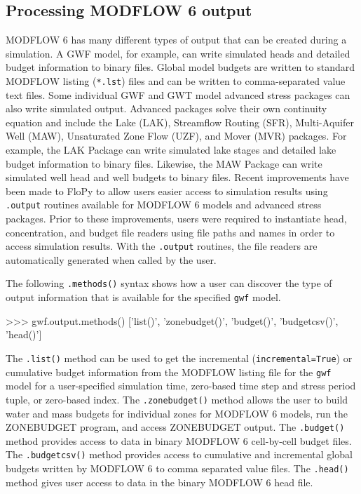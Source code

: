 \documentclass[12pt, oneside]{article}  	%
\begin{document}
\subsection*{Processing MODFLOW 6 output}

MODFLOW 6 has many different types of output that can be created during a simulation. A GWF model, for example, can write simulated heads and detailed budget information to binary files. Global model budgets are written to standard MODFLOW listing (\texttt{*.lst}) files and can be written to comma-separated value text files. Some individual GWF and GWT model advanced stress packages can also write simulated output. Advanced packages solve their own continuity equation and include the Lake (LAK), Streamflow Routing (SFR), Multi-Aquifer Well (MAW), Unsaturated Zone Flow (UZF), and Mover (MVR) packages. For example, the LAK Package can write simulated lake stages and detailed lake budget information to binary files. Likewise, the MAW Package can write simulated well head and well budgets to binary files. Recent improvements have been made to FloPy to allow users easier access to simulation results using \texttt{.output} routines available for MODFLOW 6 models and advanced stress packages. Prior to these improvements, users were required to instantiate head, concentration, and budget file readers using file paths and names in order to access simulation results. With the \texttt{.output} routines, the file readers are automatically generated when called by the user.

The following \texttt{.methods()} syntax shows how a user can discover the type of output information that is available for the specified \texttt{gwf} model.

\begin{python}
>>> gwf.output.methods()
['list()', 'zonebudget()', 'budget()', 'budgetcsv()', 'head()']
\end{python}

\noindent The \texttt{.list()} method can be used to get the incremental (\texttt{incremental=True}) or cumulative budget information from the MODFLOW listing file for the \texttt{gwf} model for a user-specified simulation time, zero-based time step and stress period tuple, or zero-based index. The \texttt{.zonebudget()} method allows the user to build water and mass budgets for individual zones for MODFLOW 6 models, run the ZONEBUDGET program, and access ZONEBUDGET output. The \texttt{.budget()} method provides access to data in binary MODFLOW 6 cell-by-cell budget files. The \texttt{.budgetcsv()} method provides access to cumulative and incremental global budgets written by MODFLOW 6 to comma separated value files. The \texttt{.head()} method gives user access to data in the binary MODFLOW 6 head file.
\end{document}
